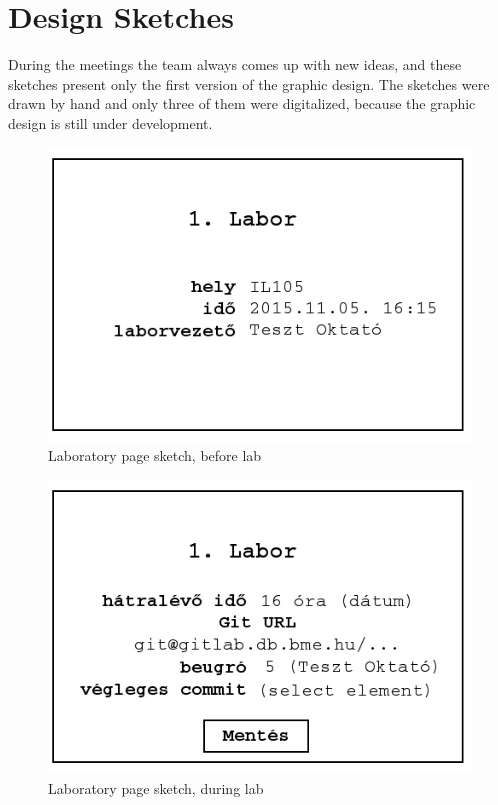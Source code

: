 \chapter{Design Sketches}
\label{appendix-design-sketches}

During the meetings the team always comes up with new ideas, and these sketches present only the first version of the graphic design. The sketches were drawn by hand and only three of them were digitalized, because the graphic design is still under development. 

%
\begin{figure}[!ht]
	\includegraphics[width=\textwidth]{figures/sketch6.png}
	\caption{Laboratory page sketch, before lab}
	\label{fig:sketch5}
\end{figure}


\begin{figure}[!ht]
	\includegraphics[width=\textwidth]{figures/sketch7.png}
	\caption{Laboratory page sketch, during lab}
	\label{fig:sketch4}
\end{figure}

